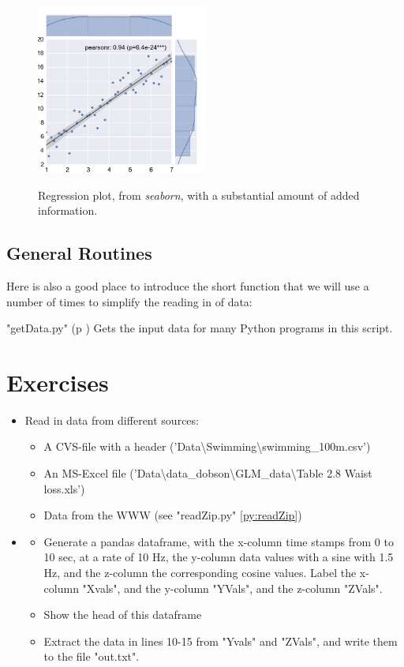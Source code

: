 \begin{figure}[ht]
  \centering
  \includegraphics[width=0.5\textwidth]{../Images/regplot.png}\\
  \caption{Regression plot, from \emph{seaborn}, with a substantial amount of added information.}
\end{figure}

\subsection{General Routines}
Here is also a good place to introduce the short function that we will use a number of times to simplify the reading in of data:

\PyImg "getData.py" (p \pageref{py:getData}) Gets the input data for many Python programs in this script.

\section{Exercises}

\begin{itemize}
  \item Read in data from different sources:
  \begin{itemize}
    \item A CVS-file with a header ('Data\textbackslash Swimming\textbackslash swimming\_100m.csv')
    \item An MS-Excel file ('Data\textbackslash data\_dobson\textbackslash GLM\_data\textbackslash Table 2.8 Waist loss.xls')
    \item Data from the WWW (see "readZip.py" \ref{py:readZip})
  \end{itemize}
  \item
  \begin{itemize}
      \item Generate a pandas dataframe, with the x-column time stamps from 0 to 10 sec, at a rate of 10 Hz, the y-column data values with a sine with 1.5 Hz, and the z-column the corresponding cosine values. Label the x-column "Xvals", and the y-column "YVals", and the z-column "ZVals".
      \item Show the head of this dataframe
      \item Extract the data in lines 10-15 from "Yvals" and "ZVals", and write them to the file "out.txt".
  \end{itemize}
\end{itemize}
